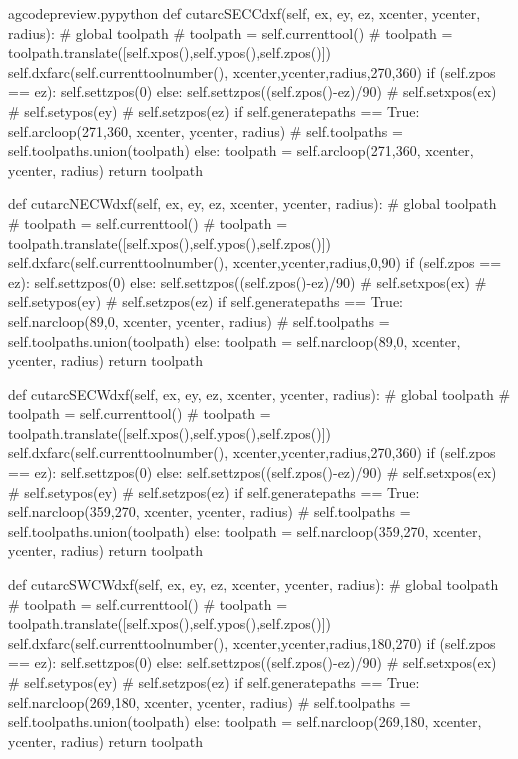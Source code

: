 \documentclass{ltxdoc}
\begin{document}
\begin{writecode}{a}{gcodepreview.py}{python}
    def cutarcSECCdxf(self, ex, ey, ez, xcenter, ycenter, radius):
#        global toolpath
#        toolpath = self.currenttool()
#        toolpath = toolpath.translate([self.xpos(),self.ypos(),self.zpos()])
        self.dxfarc(self.currenttoolnumber(), xcenter,ycenter,radius,270,360)
        if (self.zpos == ez):
            self.settzpos(0)
        else:         
            self.settzpos((self.zpos()-ez)/90)
#        self.setxpos(ex)
#        self.setypos(ey)
#        self.setzpos(ez)
        if self.generatepaths == True:
            self.arcloop(271,360, xcenter, ycenter, radius)
#            self.toolpaths = self.toolpaths.union(toolpath)
        else:
            toolpath = self.arcloop(271,360, xcenter, ycenter, radius)
            return toolpath

    def cutarcNECWdxf(self, ex, ey, ez, xcenter, ycenter, radius):
#        global toolpath
#        toolpath = self.currenttool()
#        toolpath = toolpath.translate([self.xpos(),self.ypos(),self.zpos()])
        self.dxfarc(self.currenttoolnumber(), xcenter,ycenter,radius,0,90)
        if (self.zpos == ez):
            self.settzpos(0)
        else:         
            self.settzpos((self.zpos()-ez)/90)
#        self.setxpos(ex)
#        self.setypos(ey)
#        self.setzpos(ez)
        if self.generatepaths == True:
            self.narcloop(89,0, xcenter, ycenter, radius)
#            self.toolpaths = self.toolpaths.union(toolpath)
        else:
            toolpath = self.narcloop(89,0, xcenter, ycenter, radius)
            return toolpath

    def cutarcSECWdxf(self, ex, ey, ez, xcenter, ycenter, radius):
#        global toolpath
#        toolpath = self.currenttool()
#        toolpath = toolpath.translate([self.xpos(),self.ypos(),self.zpos()])
        self.dxfarc(self.currenttoolnumber(), xcenter,ycenter,radius,270,360)
        if (self.zpos == ez):
            self.settzpos(0)
        else:         
            self.settzpos((self.zpos()-ez)/90)
#        self.setxpos(ex)
#        self.setypos(ey)
#        self.setzpos(ez)
        if self.generatepaths == True:
            self.narcloop(359,270, xcenter, ycenter, radius)
#            self.toolpaths = self.toolpaths.union(toolpath)
        else:
            toolpath = self.narcloop(359,270, xcenter, ycenter, radius)
            return toolpath

    def cutarcSWCWdxf(self, ex, ey, ez, xcenter, ycenter, radius):
#        global toolpath
#        toolpath = self.currenttool()
#        toolpath = toolpath.translate([self.xpos(),self.ypos(),self.zpos()])
        self.dxfarc(self.currenttoolnumber(), xcenter,ycenter,radius,180,270)
        if (self.zpos == ez):
            self.settzpos(0)
        else:         
            self.settzpos((self.zpos()-ez)/90)
#        self.setxpos(ex)
#        self.setypos(ey)
#        self.setzpos(ez)
        if self.generatepaths == True:
            self.narcloop(269,180, xcenter, ycenter, radius)
#            self.toolpaths = self.toolpaths.union(toolpath)
        else:
            toolpath = self.narcloop(269,180, xcenter, ycenter, radius)
            return toolpath


\end{writecode}
\end{document}
